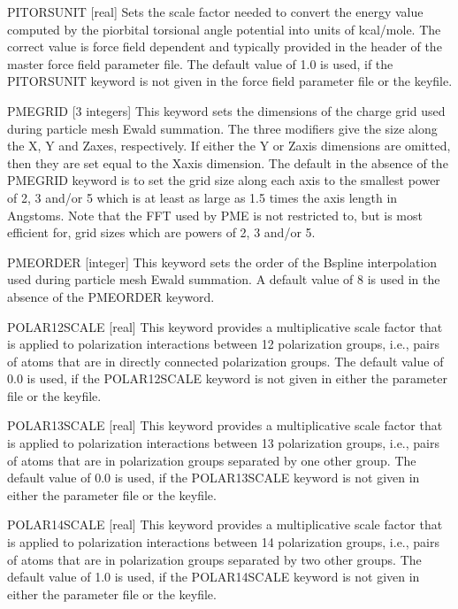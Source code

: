 \documentclass[letterpaper,11pt,english]{sphinxmanual}
\begin{document}
PITORSUNIT {[}real{]}     Sets the scale factor needed to convert the energy value computed by the pi\sphinxhyphen{}orbital torsional angle potential into units of kcal/mole. The correct value is force field dependent and typically provided in the header of the master force field parameter file. The default value of 1.0 is used, if the PITORSUNIT keyword is not given in the force field parameter file or the keyfile.

PME\sphinxhyphen{}GRID {[}3 integers{]}     This keyword sets the dimensions of the charge grid used during particle mesh Ewald summation. The three modifiers give the size along the X\sphinxhyphen{}, Y\sphinxhyphen{} and Z\sphinxhyphen{}axes, respectively. If either the Y\sphinxhyphen{} or Z\sphinxhyphen{}axis dimensions are omitted, then they are set equal to the X\sphinxhyphen{}axis dimension. The default in the absence of the PME\sphinxhyphen{}GRID keyword is to set the grid size along each axis to the smallest power of 2, 3 and/or 5 which is at least as large as 1.5 times the axis length in Angstoms. Note that the FFT used by PME is not restricted to, but is most efficient for, grid sizes which are powers of 2, 3 and/or 5.

PME\sphinxhyphen{}ORDER {[}integer{]}     This keyword sets the order of the B\sphinxhyphen{}spline interpolation used during particle mesh Ewald summation. A default value of 8 is used in the absence of the PME\sphinxhyphen{}ORDER keyword.

POLAR\sphinxhyphen{}12\sphinxhyphen{}SCALE {[}real{]}     This keyword provides a multiplicative scale factor that is applied to polarization interactions between 1\sphinxhyphen{}2 polarization groups, i.e., pairs of atoms that are in directly connected polarization groups. The default value of 0.0 is used, if the POLAR\sphinxhyphen{}12\sphinxhyphen{}SCALE keyword is not given in either the parameter file or the keyfile.

POLAR\sphinxhyphen{}13\sphinxhyphen{}SCALE {[}real{]}     This keyword provides a multiplicative scale factor that is applied to polarization interactions between 1\sphinxhyphen{}3 polarization groups, i.e., pairs of atoms that are in polarization groups separated by one other group. The default value of 0.0 is used, if the POLAR\sphinxhyphen{}13\sphinxhyphen{}SCALE keyword is not given in either the parameter file or the keyfile.

POLAR\sphinxhyphen{}14\sphinxhyphen{}SCALE {[}real{]}     This keyword provides a multiplicative scale factor that is applied to polarization interactions between 1\sphinxhyphen{}4 polarization groups, i.e., pairs of atoms that are in polarization groups separated by two other groups. The default value of 1.0 is used, if the POLAR\sphinxhyphen{}14\sphinxhyphen{}SCALE keyword is not given in either the parameter file or the keyfile.
\end{document}
